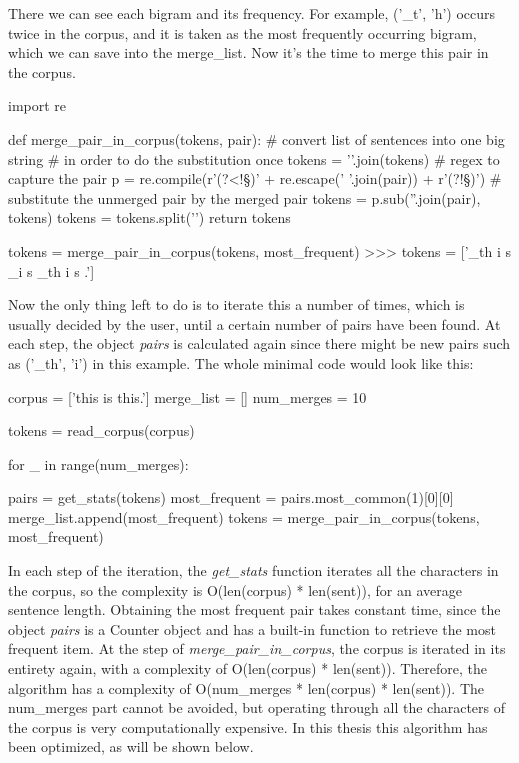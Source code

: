There we can see each bigram and its frequency. For example, ('\_t', 'h') occurs twice in the corpus, and it is taken as the most frequently occurring bigram, which we can save into the merge\_list. Now it's the time to merge this pair in the corpus.

\begin{python}
import re

def merge_pair_in_corpus(tokens, pair):
    # convert list of sentences into one big string 
    # in order to do the substitution once
    tokens = '\n'.join(tokens)
    # regex to capture the pair
    p = re.compile(r'(?<!\S)' + re.escape(' '.join(pair)) + r'(?!\S)')
    # substitute the unmerged pair by the merged pair
    tokens = p.sub(''.join(pair), tokens)
    tokens = tokens.split('\n')
    return tokens

tokens = merge_pair_in_corpus(tokens, most_frequent)
>>> tokens = ['_th i s _i s _th i s .']
\end{python}

Now the only thing left to do is to iterate this a number of times, which is usually decided by the user, until a certain number of pairs have been found. At each step, the object \emph{pairs} is calculated again since there might be new pairs such as ('\_th', 'i') in this example. The whole minimal code would look like this:

\begin{python}
corpus = ['this is this.']
merge_list = []
num_merges = 10

tokens = read_corpus(corpus)

for _ in range(num_merges):

    pairs = get_stats(tokens)
    most_frequent = pairs.most_common(1)[0][0]
    merge_list.append(most_frequent)
    tokens = merge_pair_in_corpus(tokens, most_frequent)
\end{python}

In each step of the iteration, the \emph{get\_stats} function iterates all the characters in the corpus, so the complexity is O(len(corpus) * len(sent)), for an average sentence length. Obtaining the most frequent pair takes constant time, since the object \emph{pairs} is a Counter object and has a built-in function to retrieve the most frequent item. At the step of \emph{merge\_pair\_in\_corpus}, the corpus is iterated in its entirety again, with a complexity of O(len(corpus) * len(sent)). Therefore, the algorithm has a complexity of O(num\_merges * len(corpus) * len(sent)). The num\_merges part cannot be avoided, but operating through all the characters of the corpus is very computationally expensive. In this thesis this algorithm has been optimized, as will be shown below.


